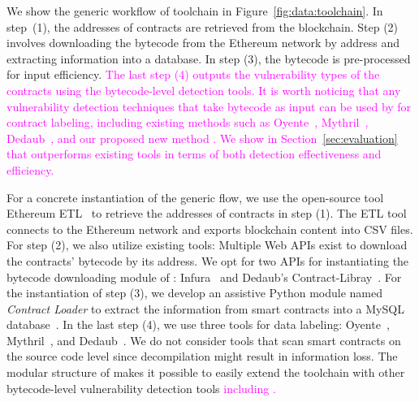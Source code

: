 We show the generic workflow of \datatool{} toolchain in Figure~\ref{fig:data:toolchain}.
In step~(1), the addresses of contracts are retrieved from the blockchain. Step (2) involves downloading 
the bytecode from the Ethereum network by address and extracting information into a database. In step (3), the bytecode is pre-processed for input efficiency. 
\textcolor{magenta}{The last step (4) outputs the vulnerability types of the contracts using the bytecode-level detection tools. It is worth noticing that any vulnerability detection techniques that take bytecode as input can be used by \datatool{} for contract labeling, including existing methods such as Oyente~\cite{rw_oyente_repo}, Mythril~\cite{rw_mythril_repo}, Dedaub~\cite{dedaub}, and our proposed new method \sys{}. We show in Section~\ref{sec:evaluation} that \sys{} outperforms existing tools in terms of both detection effectiveness and efficiency.}

For a concrete instantiation of the generic flow, we use the open-source tool Ethereum ETL~\cite{ethereum-etl-article,ethereum-etl-repo} to retrieve the addresses of contracts in step (1). The ETL tool connects to the Ethereum network and exports blockchain content into CSV files. For step (2), we also utilize existing tools: Multiple Web APIs exist to download the contracts' bytecode by its address. We opt for two APIs for instantiating the bytecode downloading module of \datatool{}: Infura~\cite{infura} and Dedaub's Contract-Libray~\cite{dedaub}. For the instantiation of step (3), we develop an assistive Python module named \textit{Contract Loader} to extract the information from smart contracts into a MySQL database~\cite{mysql}. 
In the last step (4), we use three tools for data labeling:  Oyente~\cite{rw_oyente_repo}, Mythril~\cite{rw_mythril_repo}, and Dedaub~\cite{dedaub}. 
We do not consider tools that scan smart contracts on the source code level since decompilation might result in information loss. 
The modular structure of \datatool{} makes it possible to easily extend the toolchain with other bytecode-level vulnerability detection tools \textcolor{magenta}{including \sys{}.}

\vspace{-0.4em}
